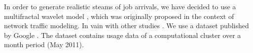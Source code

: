 \cite{leland1994}

In order to generate realistic steams of job arrivals, we have decided to use a
multifractal wavelet model \cite{riedi1999}, which was originally proposed in
the context of network traffic modeling. In vain with other studies
\cite{nikitovic2004}. We use a dataset published by Google \cite{google}. The
dataset contains usage data of a computational cluster over a month period (May
2011).
